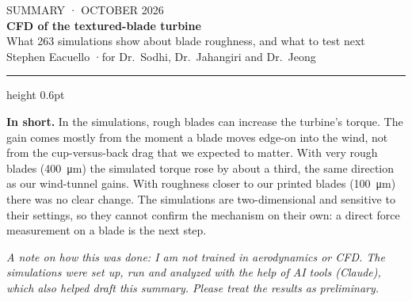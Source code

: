 \documentclass[11pt]{article}
\begin{document}
\thispagestyle{empty}
\begin{flushleft}
{\sffamily\small\color{ink2} SUMMARY \quad· OCTOBER 2026}\\[0.4em]
{\sffamily\LARGE\bfseries\color{navy} CFD of the textured-blade turbine}\\[0.3em]
{\sffamily\normalsize What 263 simulations show about blade roughness, and what to test next}\\[0.3em]
{\sffamily\small Stephen Eacuello \quad·\quad for Dr.\ Sodhi, Dr.\ Jahangiri and Dr.\ Jeong}
\end{flushleft}
{\color{rule}\hrule height 0.6pt}
\vspace{0.6em}

\begin{keybox}
\textbf{In short.} In the simulations, rough blades can increase the turbine's torque. The gain
comes mostly from the moment a blade moves edge-on into the wind, not from the cup-versus-back drag
that we expected to matter. With very rough blades (\SI{400}{\micro\metre}) the simulated torque rose
by about a third, the same direction as our wind-tunnel gains. With roughness closer to our printed
blades (\SI{100}{\micro\metre}) there was no clear change. The simulations are two-dimensional and
sensitive to their settings, so they cannot confirm the mechanism on their own: a direct force
measurement on a blade is the next step.
\end{keybox}

{\small\textit{A note on how this was done: I am not trained in aerodynamics or CFD. The simulations were set up, run and analyzed with the help of AI tools (Claude), which also helped draft this summary. Please treat the results as preliminary.}}
\end{document}
